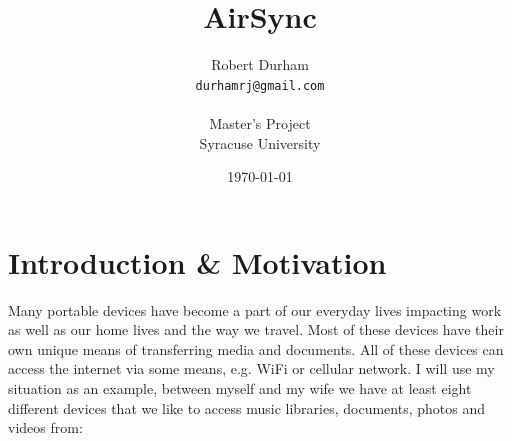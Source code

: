 \documentclass[12pt]{article}
\begin{document}
\begin{titlepage}


\title {AirSync}

\author {Robert Durham\\
	\texttt{durhamrj@gmail.com}\\
	\\
	Master's Project\\
	Syracuse University}
\date {\today}

\end{titlepage}
\maketitle

\newpage

\section{Introduction \& Motivation}
Many portable devices have become a part of our everyday lives impacting work as well as our home lives and the way we travel. Most of these devices have their own unique means of transferring media and documents. All of these devices can access the internet via some means, e.g. WiFi or cellular network. I will use my situation as an example, between myself and my wife we have at least eight different devices that we like to access music libraries, documents, photos and videos from:
\end{document}
